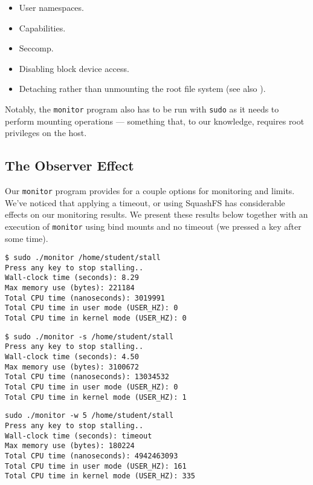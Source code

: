 \begin{itemize}

\item User namespaces.

\item Capabilities.

\item Seccomp.

\item Disabling block device access.

\item Detaching rather than unmounting the root file system (see also
).

\end{itemize}

Notably, the \texttt{monitor} program also has to be run with \texttt{sudo} as
it needs to perform mounting operations --- something that, to our knowledge,
requires root privileges on the host.

\subsection{The Observer Effect}

Our \texttt{monitor} program provides for a couple options for monitoring and
limits. We've noticed that applying a timeout, or using SquashFS has
considerable effects on our monitoring results. We present these results below
together with an execution of \texttt{monitor} using bind mounts and no timeout
(we pressed a key after some time).

\begin{lstlisting}
$ sudo ./monitor /home/student/stall
Press any key to stop stalling..
Wall-clock time (seconds): 8.29
Max memory use (bytes): 221184
Total CPU time (nanoseconds): 3019991
Total CPU time in user mode (USER_HZ): 0
Total CPU time in kernel mode (USER_HZ): 0
\end{lstlisting}

\begin{lstlisting}
$ sudo ./monitor -s /home/student/stall
Press any key to stop stalling..
Wall-clock time (seconds): 4.50
Max memory use (bytes): 3100672
Total CPU time (nanoseconds): 13034532
Total CPU time in user mode (USER_HZ): 0
Total CPU time in kernel mode (USER_HZ): 1
\end{lstlisting}

\begin{lstlisting}
sudo ./monitor -w 5 /home/student/stall
Press any key to stop stalling..
Wall-clock time (seconds): timeout
Max memory use (bytes): 180224
Total CPU time (nanoseconds): 4942463093
Total CPU time in user mode (USER_HZ): 161
Total CPU time in kernel mode (USER_HZ): 335
\end{lstlisting}

